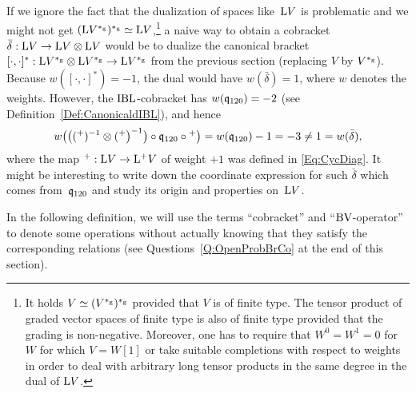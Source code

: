\documentclass[\MainFolder/Text.tex]{subfiles}
\begin{document}
\begin{Remark}
If we ignore the fact that the dualization of spaces like~$\mathrm{L} V$ is problematic and we might not get $(\mathrm{L} V^{*_{\mathrm{g}}})^{*_{\mathrm{g}}}\simeq \mathrm{L} V$,\footnote{It holds $V\simeq (V^{*_{\mathrm{g}}})^{*_{\mathrm{g}}}$ provided that $V$ is of finite type. The tensor product of graded vector spaces of finite type is also of finite type provided that the grading is non-negative. Moreover, one has to require that $W^0 =W^1=0$ for $W$ for which $V=W[1]$ or take suitable completions with respect to weights in order to deal with arbitrary long tensor products in the same degree in the dual of $\mathrm{L} V$.} a naive way to obtain a cobracket $\bar{\delta}: \mathrm{L} V\rightarrow\mathrm{L} V \otimes\mathrm{L} V$ would be to dualize the  canonical bracket $[\cdot,\cdot]^*: \mathrm{L} V^{*_{\mathrm{g}}} \otimes \mathrm{L} V^{*_{\mathrm{g}}} \rightarrow \mathrm{L} V^{*_{\mathrm{g}}}$ from the previous section (replacing $V$ by $V^{*_{\mathrm{g}}}$). Because $w([\cdot,\cdot]^*) = -1$, the dual would have $w(\bar{\delta}) = 1$, where $w$ denotes the weights. However, the $\mathrm{IBL}$-cobracket has $w(\mathfrak{q}_{120})=-2$ (see Definition~\ref{Def:CanonicaldIBL}), and hence 
\[w\bigl(\bigl(({}^+)^{-1}\otimes({}^+\bigr)^{-1}\bigr)\circ\mathfrak{q}_{120}\circ{}^+\bigr) = w(\mathfrak{q}_{120}) - 1 = - 3 \neq 1 = w(\bar{\delta}), \]
where the map ${}^+: \mathrm{L} V\rightarrow\mathrm{L}^+ V$ of weight $+1$ was defined in \eqref{Eq:CycDiag}. It might be interesting to write down the coordinate expression for such $\bar{\delta}$ which comes from~$\mathfrak{q}_{120}$ and study its origin and properties on~$\mathrm{L} V$.
\end{Remark}

In the following definition, we will use the terms ``cobracket'' and ``$\mathrm{BV}$-operator'' to denote some operations without actually knowing that they satisfy the corresponding relations (see Questions~\ref{Q:OpenProbBrCo} at the end of this section).
 
\end{document}
